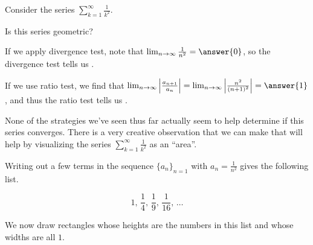 \documentclass{ximera}
\begin{document}
\begin{model}
Consider the series $\sum_{k=1}^{\infty} \frac{1}{k^2}$.  

\begin{question}
Is this series geometric?
\begin{multipleChoice}
\end{multipleChoice}
\end{question}

\begin{question}
If we apply divergence test, note that $\lim_{n \to \infty} \frac{1}{n^2} = \answer{0}$, so the divergence test tells us . 
\end{question}

\begin{question}
If we use ratio test, we find that $\lim_{n \to \infty} \left| \frac{a_{n+1}}{a_n} \right| = \lim_{n \to \infty} \left| \frac{n^2}{(n+1)^2} \right| = \answer{1}$, and thus the ratio test tells us . 
\end{question}

None of the strategies we've seen thus far actually seem to help determine if this series converges.  There is a very creative  observation that we can make that will help by visualizing the series $\sum_{k=1}^{\infty} \frac{1}{k^2}$ as an ``area''.

Writing out a few terms in the sequence $\{a_n\}_{n=1}$ with $a_n = \frac{1}{n^2}$ gives the following list. 

\[
1, \, \frac{1}{4}, \, \frac{1}{9}, \, \frac{1}{16}, \, \dots 
\]

We now draw rectangles whose heights are the numbers in this list and whose widths are all $1$.


\begin{image}
\end{image}
\end{model}
\end{document}
